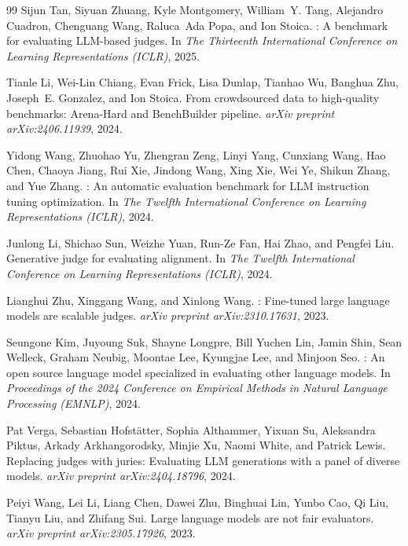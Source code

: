 \begin{thebibliography}{99}
Sijun Tan, Siyuan Zhuang, Kyle Montgomery, William~Y. Tang, Alejandro Cuadron, Chenguang Wang, Raluca~Ada Popa, and Ion Stoica.
: A benchmark for evaluating {LLM}-based judges.
\newblock In \emph{The Thirteenth International Conference on Learning Representations (ICLR)}, 2025.

Tianle Li, Wei-Lin Chiang, Evan Frick, Lisa Dunlap, Tianhao Wu, Banghua Zhu, Joseph~E. Gonzalez, and Ion Stoica.
\newblock From crowdsourced data to high-quality benchmarks: {Arena-Hard} and {BenchBuilder} pipeline.
\newblock \emph{arXiv preprint arXiv:2406.11939}, 2024.

Yidong Wang, Zhuohao Yu, Zhengran Zeng, Linyi Yang, Cunxiang Wang, Hao Chen, Chaoya Jiang, Rui Xie, Jindong Wang, Xing Xie, Wei Ye, Shikun Zhang, and Yue Zhang.
: An automatic evaluation benchmark for {LLM} instruction tuning optimization.
\newblock In \emph{The Twelfth International Conference on Learning Representations (ICLR)}, 2024.

Junlong Li, Shichao Sun, Weizhe Yuan, Run-Ze Fan, Hai Zhao, and Pengfei Liu.
\newblock Generative judge for evaluating alignment.
\newblock In \emph{The Twelfth International Conference on Learning Representations (ICLR)}, 2024.

Lianghui Zhu, Xinggang Wang, and Xinlong Wang.
: Fine-tuned large language models are scalable judges.
\newblock \emph{arXiv preprint arXiv:2310.17631}, 2023.

Seungone Kim, Juyoung Suk, Shayne Longpre, Bill Yuchen Lin, Jamin Shin, Sean Welleck, Graham Neubig, Moontae Lee, Kyungjae Lee, and Minjoon Seo.
: An open source language model specialized in evaluating other language models.
\newblock In \emph{Proceedings of the 2024 Conference on Empirical Methods in Natural Language Processing (EMNLP)}, 2024.

Pat Verga, Sebastian Hofst{\"a}tter, Sophia Althammer, Yixuan Su, Aleksandra Piktus, Arkady Arkhangorodsky, Minjie Xu, Naomi White, and Patrick Lewis.
\newblock Replacing judges with juries: Evaluating {LLM} generations with a panel of diverse models.
\newblock \emph{arXiv preprint arXiv:2404.18796}, 2024.

Peiyi Wang, Lei Li, Liang Chen, Dawei Zhu, Binghuai Lin, Yunbo Cao, Qi Liu, Tianyu Liu, and Zhifang Sui.
\newblock Large language models are not fair evaluators.
\newblock \emph{arXiv preprint arXiv:2305.17926}, 2023.


\end{thebibliography}
